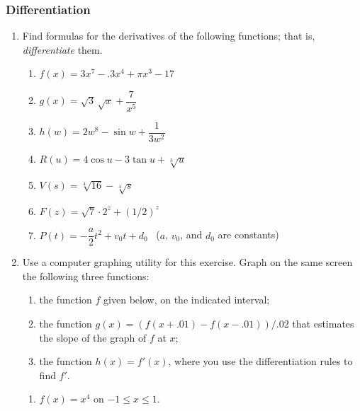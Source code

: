 \subsubsection{Differentiation}
\label{subsubsec:differentiation}



\begin{enumerate}
\item Find formulas for the derivatives of the following functions; that is, {\em differentiate\/} them.

  \begin{enumerate}
  \item $f(x) = 3x^7 - .3 x^4 + \pi x^3 - 17$


  \item $g(x) = \sqrt{3}\,\sqrt{x} + \dfrac{7}{x^5}$


  \item $h(w) = 2w^8 - \sin{w} + \dfrac{1}{3 w^2}$


  \item $R(u) = 4\cos{u} - 3\tan{u} + \sqrt[3]{u}$


  \item $V(s) = \sqrt[4]{16} - \sqrt[4]{s}$


  \item $F(z) = \sqrt{7} \cdot 2^z + (1/2)^z$


  \item $P(t) =  -\dfrac{a}{2} t^2 + v_0 t + d_0$  \ ($a$, $v_0$, and $d_0$ are constants)



\end{enumerate}
\item Use a computer graphing utility for this exercise.  Graph on the
same screen the following three functions:
\begin{enumerate}

\item the function $f$ given below, on the indicated interval;

\item the function $g(x) = \left(f(x+.01) - f(x-.01)\right)/.02$ that
  estimates the slope of the graph of $f$ at $x$;

\item the function $h(x) = f'(x)$, where you use the differentiation
  rules to find $f'$.

\end{enumerate}


  \begin{enumerate}
  \item $f(x) = x^4$ on $-1 \leq x \leq 1$.


\end{enumerate}
\end{enumerate}
